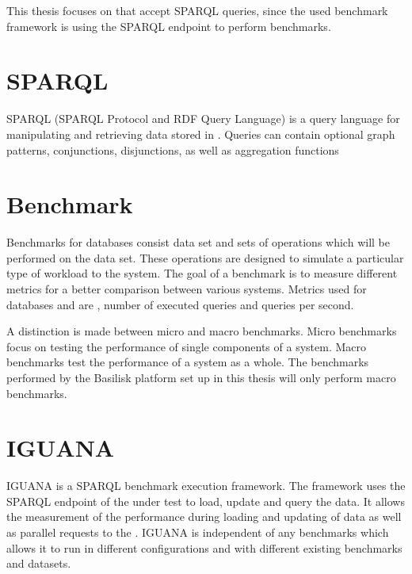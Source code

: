 This thesis focuses on \tsp{} that accept SPARQL queries, since the used benchmark framework \iguana{} is using the SPARQL endpoint to perform benchmarks\cite{conradsIguanaGenericFramework2017}.


\section{SPARQL}
\label{sec:sparql}
SPARQL (SPARQL Protocol and RDF Query Language)\cite{harrisSPARQLQueryLanguage} is a query language for manipulating and retrieving data stored in \tsp{}.
Queries can contain optional graph patterns, conjunctions, disjunctions, as well as aggregation functions


\section{Benchmark}
\label{sec:benchmark}
Benchmarks for databases consist data set and sets of operations which will be performed on the data set.
These operations are designed to simulate a particular type of workload to the system.
The goal of a benchmark is to measure different metrics for a better comparison between various systems.
Metrics used for databases and \tsp{} are \eg, number of executed queries and queries per second\cite{MetricsIguanaDocumentation}.

A distinction is made between micro and macro benchmarks.
Micro benchmarks focus on testing the performance of single components of a system.
Macro benchmarks test the performance of a system as a whole.
The benchmarks performed by the Basilisk platform set up in this thesis will only perform macro benchmarks.


\section{IGUANA}
\label{sec:iguana}
IGUANA is a SPARQL benchmark execution framework\cite{conradsIguanaGenericFramework2017}.
The framework uses the SPARQL endpoint of the \ts{} under test to load, update and query the data.
It allows the measurement of the performance during loading and updating of data as well as parallel requests to the \ts{}.
IGUANA is independent of any benchmarks which allows it to run in different configurations and with different existing benchmarks and datasets.
























